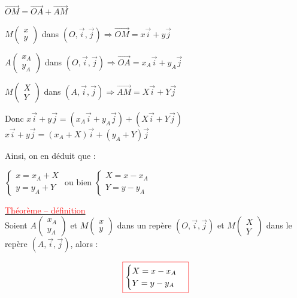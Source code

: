 \documentclass[12pt,a4paper]{article}
\begin{document}
$\overrightarrow{OM} = \overrightarrow{OA} + \overrightarrow{AM}$

$M \begin{pmatrix} x \\ y \end{pmatrix}$ dans $(O, \vec{i}, \vec{j}) \Rightarrow \overrightarrow{OM} = x\vec{i} + y\vec{j}$

$A \begin{pmatrix} x_A \\ y_A \end{pmatrix}$ dans $(O, \vec{i}, \vec{j}) \Rightarrow \overrightarrow{OA} = x_A\vec{i} + y_A\vec{j}$

$M \begin{pmatrix} X \\ Y \end{pmatrix}$ dans $(A, \vec{i}, \vec{j}) \Rightarrow \overrightarrow{AM} = X\vec{i} + Y\vec{j}$

Donc $x\vec{i} + y\vec{j} = (x_A\vec{i} + y_A\vec{j}) + (X\vec{i} + Y\vec{j})$ \\
\indent \enspace $x\vec{i} + y\vec{j} = (x_A + X)\vec{i} + (y_A + Y)\vec{j}$

Ainsi, on en déduit que :

\begin{center}
{\color{red}
$\begin{cases} x = x_A + X \\ y = y_A + Y \end{cases}$} 
\quad ou bien \quad 
{\color{red}
$\begin{cases} X = x - x_A \\ Y = y - y_A \end{cases}$}
\end{center}

\noindent \underline{\textcolor{red}{Théorème -- définition}} \\
Soient $A \begin{pmatrix} x_A \\ y_A \end{pmatrix}$ et $M \begin{pmatrix} x \\ y \end{pmatrix}$ dans un repère $(O, \vec{i}, \vec{j})$ et $M \begin{pmatrix} X \\ Y \end{pmatrix}$ dans le repère $(A, \vec{i}, \vec{j})$, alors :

\[
\fcolorbox{red}{white}{$ \begin{cases} X = x - x_A \\ Y = y - y_A \end{cases} $}
\]
\end{document}

